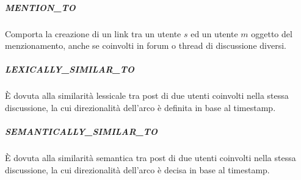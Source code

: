 
\subparagraph{MENTION\_TO}
Comporta la creazione di un link tra un utente \( s \) ed un utente \( m \) oggetto del menzionamento, anche se coinvolti in forum o thread di discussione diversi.


\subparagraph{LEXICALLY\_SIMILAR\_TO}
{\`E} dovuta alla similarit{\`a} lessicale tra post di due utenti coinvolti nella stessa discussione, la cui direzionalit{\`a} dell'arco {\`e} definita in base al timestamp.


\subparagraph{SEMANTICALLY\_SIMILAR\_TO}
{\`E} dovuta alla similarit{\`a} semantica tra post di due utenti coinvolti nella stessa discussione, la cui direzionalit{\`a} dell'arco {\`e} decisa in base al timestamp.

